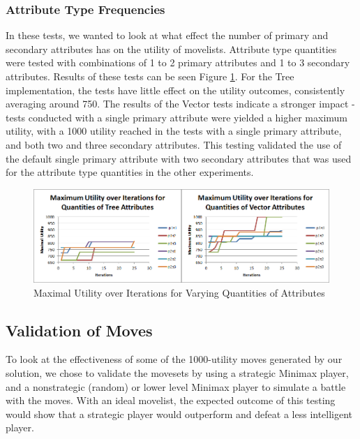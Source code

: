 \documentclass{acm_proc_article-sp}
\begin{document}
    \subsubsection{Attribute Type Frequencies}

In these tests, we wanted to look at what effect the number of primary and secondary attributes has on the utility of movelists. Attribute type quantities were tested with combinations of 1 to 2 primary attributes and 1 to 3 secondary attributes. Results of these tests can be seen Figure \ref{attribute_frequency_experiments}. For the Tree implementation, the tests have little effect on the utility outcomes, consistently averaging around 750. The results of the Vector tests indicate a stronger impact - tests conducted with a single primary attribute were yielded a higher maximum utility, with a 1000 utility reached in the tests with a single primary attribute, and both two and three secondary attributes. This testing validated the use of the default single primary attribute with two secondary attributes that was used for the attribute type quantities in the other experiments.

\begin{figure}[t]
    \centering
    \includegraphics[width=\textwidth,keepaspectratio]{./images/attr_frquency_comparison.png}
    \caption{Maximal Utility over Iterations for Varying Quantities of Attributes}
    \label{attribute_frequency_experiments}
\end{figure}
    
    \subsection{Validation of Moves}

To look at the effectiveness of some of the 1000-utility moves generated by our solution, we chose to validate the movesets by using a strategic Minimax player, and a nonstrategic (random) or lower level Minimax player to simulate a battle with the moves. With an ideal movelist, the expected outcome of this testing would show that a strategic player would outperform and defeat a less intelligent player.
\end{document}

